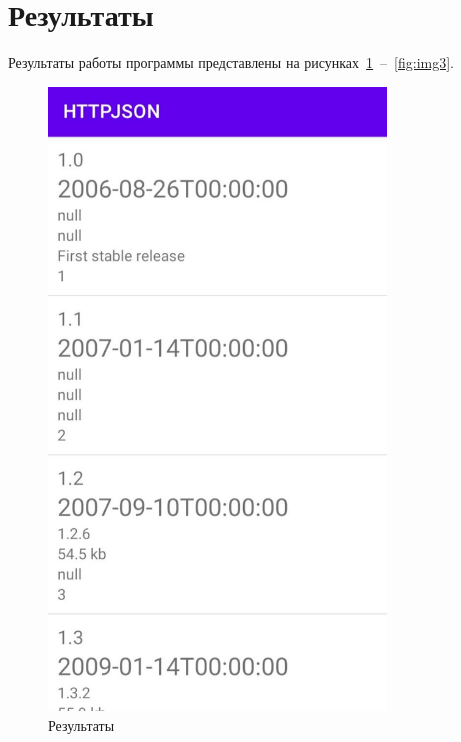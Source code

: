 \documentclass[a4paper, 14pt]{extarticle}
\begin{document}
\section{Результаты}\label{Sect::res}

Результаты работы программы представлены на рисунках~\ref{fig:img1}~--~\ref{fig:img3}.    

\begin{figure}[!htb]
	\centering
	\includegraphics[width=0.8\textwidth]{img1}
\caption{Результаты}
\label{fig:img1}
\end{figure}
\end{document}

